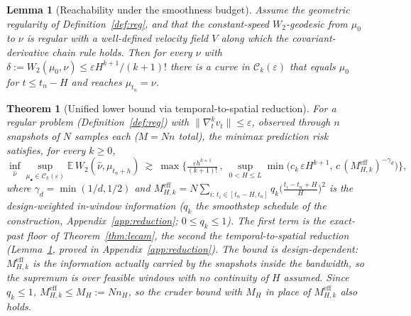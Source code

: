 \documentclass[11pt]{article}
\newtheorem{theorem}{Theorem}
\newtheorem{lemma}{Lemma}
\theoremstyle{definition}
\theoremstyle{remark}
\newcommand{\E}{\mathbb{E}}
\newcommand{\Ck}{\mathcal{C}_k(\varepsilon)}
\begin{document}
\begin{lemma}[Reachability under the smoothness budget]\label{lem:reach}
Assume the geometric regularity of Definition~\ref{def:reg}, and that the constant-speed
$W_2$-geodesic from $\mu_0$ to $\nu$ is regular with a well-defined velocity field $V$ along which
the covariant-derivative chain rule holds. Then for every $\nu$ with
$\delta:=W_2(\mu_0,\nu)\le \varepsilon H^{k+1}/(k+1)!$ there is a curve in $\Ck$ that equals
$\mu_0$ for $t\le t_n-H$ and reaches $\mu_{t_n}=\nu$.
\end{lemma}

\begin{theorem}[Unified lower bound via temporal-to-spatial reduction]\label{thm:unified}
For a regular problem (Definition~\ref{def:reg}) with $\|\nabla_t^k v_t\|\le\varepsilon$,
observed through $n$ snapshots of $N$ samples each ($M=Nn$ total), the minimax prediction risk
satisfies, for every $k\ge0$,
\[
   \inf_{\hat\nu}\sup_{\mu_\bullet\in\Ck}\E\,W_2(\hat\nu,\mu_{t_n+h})\ \gtrsim\
   \max\!\Big\{\tfrac{\varepsilon h^{k+1}}{(k+1)!}\,,\
   \sup_{0<H\le L}\min\!\Big(c_k\,\varepsilon H^{k+1},\,c\,(M^{\mathrm{eff}}_{H,k})^{-\gamma_d}\Big)\Big\},
\]
where $\gamma_d=\min(1/d,1/2)$ and
$M^{\mathrm{eff}}_{H,k}=N\sum_{i:\,t_i\in[t_n-H,t_n]}q_k\big(\tfrac{t_i-t_n+H}{H}\big)^2$ is the
design-weighted in-window information ($q_k$ the smoothstep schedule of the construction,
Appendix~\ref{app:reduction}; $0\le q_k\le1$). The first term is the exact-past floor of
Theorem~\ref{thm:lecam}, the second the temporal-to-spatial reduction (Lemma~\ref{lem:reach}, proved
in Appendix~\ref{app:reduction}). The bound is \emph{design-dependent}: $M^{\mathrm{eff}}_{H,k}$ is the
information actually carried by the snapshots inside the bandwidth, so the supremum is over feasible
windows with no continuity of $H$ assumed. Since $q_k\le1$, $M^{\mathrm{eff}}_{H,k}\le M_H:=Nn_H$, so
the cruder bound with $M_H$ in place of $M^{\mathrm{eff}}_{H,k}$ also holds.
\end{theorem}
\end{document}
